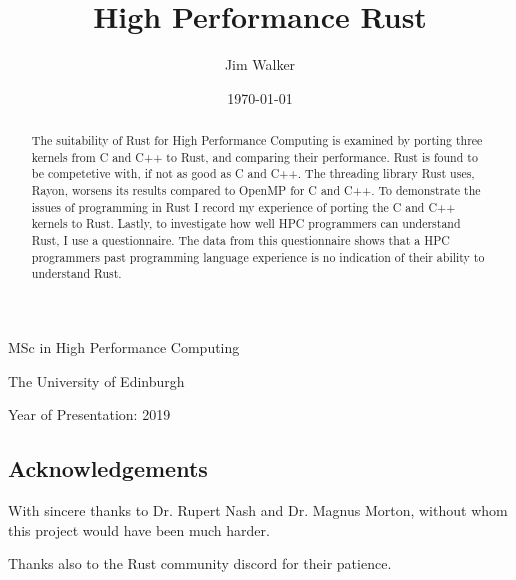 \documentclass[12pt,a4paper]{report}
\begin{document}




\title{High Performance Rust}
\author{Jim Walker}
\date{\today}

\makeEPCCtitle

\thispagestyle{empty}

\vspace{12cm}

\begin{center}

\large{MSc in High Performance Computing}

\large{The University of Edinburgh}

\large{Year of Presentation: 2019}

\end{center}

\newpage

\begin{abstract}
    The suitability of Rust for High Performance Computing is examined by porting three kernels from C and C++ to Rust, and comparing their performance. Rust is found to be competetive with, if not as good as C and C++. The threading library Rust uses, Rayon, worsens its results compared to OpenMP for C and C++. To demonstrate the issues of programming in Rust I record my experience of porting the C and C++ kernels to Rust. Lastly, to investigate how well HPC programmers can understand Rust, I use a questionnaire. The data from this questionnaire shows that a HPC programmers past programming language experience is no indication of their ability to understand Rust.
\end{abstract}


\tableofcontents
\listoftables
\listoffigures
\lstlistoflistings

\begin{titlepage}
\vspace*{2in}
\section*{Acknowledgements}
With sincere thanks to Dr. Rupert Nash and Dr. Magnus Morton, without whom this project would have been much harder. 

Thanks also to the Rust community discord for their patience.

\end{titlepage}
\end{document}
